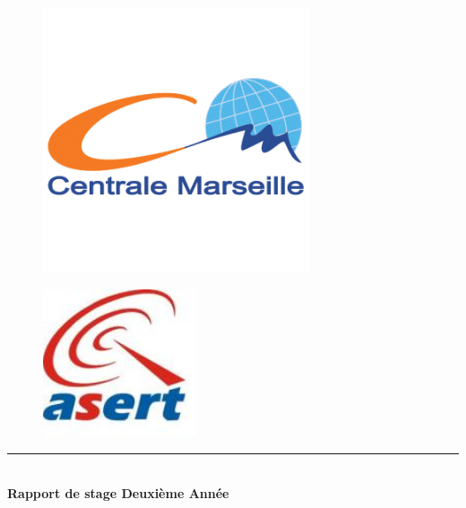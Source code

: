 \begin{titlepage}
\begin{center}

\begin{figure}[ht]
  \begin{minipage}[b]{0.5\linewidth}
    \centering
    \includegraphics[width=0.7\textwidth]{img/logo_ecm}
    \label{logo_ecm}
  \end{minipage}
  \hspace{0.5cm}
  \begin{minipage}[t]{0.5\linewidth}
    \vspace{-4cm}
    \begin{center}
    \includegraphics[width=0.4\textwidth]{img/logo_asert}
    \end{center}
    \label{logo_asert}
  \end{minipage}
\end{figure}



\vspace{2cm}
\hrule  ~\\[0.4cm]
{ \huge \bfseries Rapport de stage Deuxième Année}\\[0.4cm]


\end{center}
\end{titlepage}
